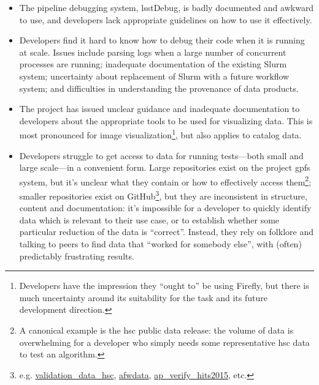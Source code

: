 \begin{itemize}

  \item{The pipeline debugging system, lsstDebug, is badly documented and
  awkward to use, and developers lack appropriate guidelines on how to use it
  effectively.}

  \item{Developers find it hard to know how to debug their code when it is
  running at scale. Issues include parsing logs when a large number of
  concurrent processes are running; inadequate documentation of the existing
  Slurm system; uncertainty about replacement of Slurm with a future workflow
  system; and difficulties in understanding the provenance of data products.}

  \item{The project has issued unclear guidance and inadequate documentation
  to developers about the appropriate tools to be used for visualizing data.
  This is most pronounced for image visualization\footnote{Developers have the
  impression they ``ought to'' be using Firefly, but there is much uncertainty
  around its suitability for the task and its future development direction.},
  but also applies to catalog data.}

  \item{Developers struggle to get access to data for running tests---both
  small and large scale---in a convenient form. Large repositories exist on
  the project \gls{gpfs} system, but it's unclear what they contain or how
  to effectively access them\footnote{A canonical example is the \gls{hsc}
  public data release: the volume of data is overwhelming for a developer who
  simply needs some representative \gls{hsc} data to test an algorithm.};
  smaller repositories exist on GitHub\footnote{e.g.
  \href{https://github.com/lsst/validation_data_hsc}{validation\_data\_hsc},
  \href{https://github.com/lsst/afwdata}{afwdata},
  \href{https://github.com/lsst/ap_verify_hits2015}{ap\_verify\_hits2015},
  etc.}, but they are inconsistent in structure, content and documentation:
  it's impossible for a developer to quickly identify data which is relevant
  to their use case, or to establish whether some particular reduction of the
  data is ``correct''. Instead, they rely on folklore and talking to peers to
  find data that ``worked for somebody else'', with (often) predictably
  frustrating results.}

\end{itemize}

